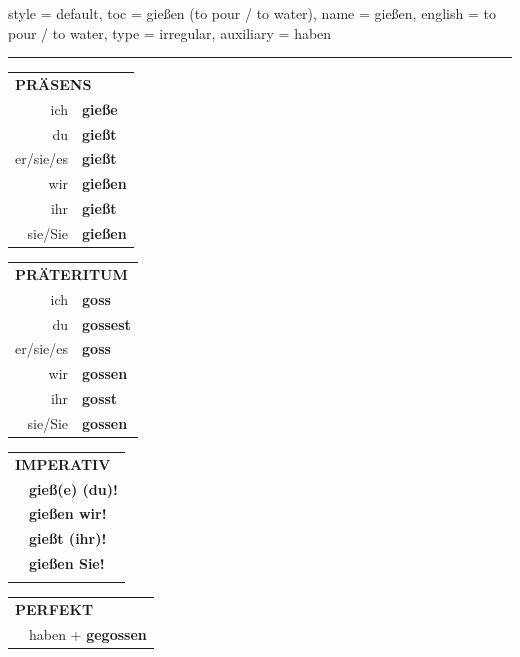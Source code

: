 \begin{verbentry}{
  style = {default},
  toc = {gießen (to pour / to water)},
  name = {gießen},
  english = {to pour / to water},
  type = {irregular},
  auxiliary = {haben}
}
 
    
     \vspace{5pt}

    \hrule
    
    \vspace{5pt}

  \begin{tabular}{rl}
     \multicolumn{2}{l}{\textbf{PRÄSENS} }\\
    ich & \textbf{gieße}\\
    du & \textbf{gießt}\\
    er/sie/es & \textbf{gießt}\\
    wir & \textbf{gießen}\\
    ihr & \textbf{gießt}\\
    sie/Sie & \textbf{gießen}\\
  \end{tabular}
  \hfill
     \begin{tabular}{rl}
    \multicolumn{2}{l}{\textbf{PRÄTERITUM} }\\
    ich & \textbf{goss}\\
    du & \textbf{gossest}\\
    er/sie/es & \textbf{goss}\\
    wir & \textbf{gossen}\\
    ihr & \textbf{gosst}\\
    sie/Sie & \textbf{gossen}\\
  \end{tabular}
  \hfill
  \begin{tabular}{rl}
     \multicolumn{2}{l}{\textbf{IMPERATIV} }\\
   & \textbf{gieß(e) (du)!}\\
   & \textbf{gießen wir!}\\
   & \textbf{gießt (ihr)!}\\
   & \textbf{gießen Sie!}\\
   & \vspace{10pt}
  \end{tabular}

    \vspace{10pt}

 \begin{tabular}{rl}
     \multicolumn{2}{l}{\textbf{PERFEKT}}\\
   & haben + \textbf{gegossen}\\
  \end{tabular}
\hfill
   \begin{tabular}{rl}
   

\end{tabular}
\end{verbentry}
